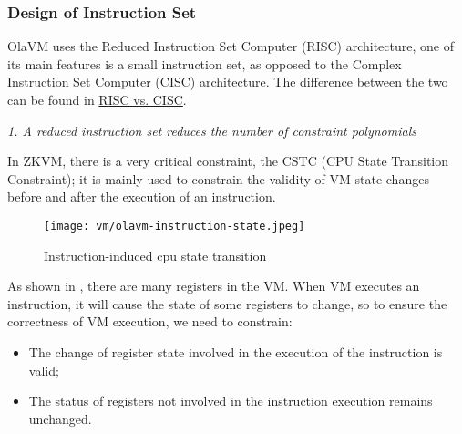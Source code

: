 \subsubsection{Design of Instruction Set} \label{sec:design-instruction-set}

OlaVM uses the Reduced Instruction Set Computer (RISC) architecture, one of its main features is a small instruction set, as opposed
to the Complex Instruction Set Computer (CISC) architecture. The difference between the two can be found in
\href{https://cs.stanford.edu/people/eroberts/courses/soco/projects/risc/risccisc/}{RISC vs. CISC}.

\emph{1. A reduced instruction set reduces the number of constraint polynomials}

In ZKVM, there is a very critical constraint, the CSTC (CPU State Transition Constraint); it is mainly used to constrain the validity
of VM state changes before and after the execution of an instruction.

\begin{figure}[!ht]
    \centering
    \texttt{[image: vm/olavm-instruction-state.jpeg]}
    \caption{Instruction-induced cpu state transition}
    \label{fig:instruction-cpu-state-transition}
\end{figure}

As shown in , there are many registers in the VM. When VM executes an instruction, it will
cause the state of some registers to change, so to ensure the correctness of VM execution, we need to constrain:
\begin{itemize}
    \item The change of register state involved in the execution of the instruction is valid;
    \item The status of registers not involved in the instruction execution remains unchanged.
\end{itemize}

